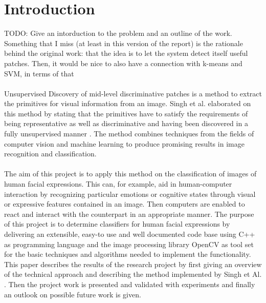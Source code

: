 
\section{Introduction}\label{sec:Introduction}

TODO: Give an intorduction to the problem and an outline of the work. Something that I miss (at least in this version of the report) is the rationale behind the original work: that the idea is to let the system detect itself useful patches. Then, it would be nice to also have a connection with k-means and SVM, in terms of that
\\
\\
Unsupervised Discovery of mid-level discriminative patches is a method to extract the primitives for visual information from an image.  Singh et al. elaborated on this method by stating that the primitives have to satisfy the requirements of being representative as well as discriminative and having been discovered in a fully unsupervised manner \cite{Singh2012DiscPat}. The method combines techniques from the fields of computer vision and machine learning to produce promising results in image recognition and classification. 
\\
\\
The aim of this project is to apply this method on the classification of images of human facial expressions. This can, for example, aid in human-computer interaction by recognizing particular emotions or cognitive states through visual or expressive features contained in an image. Then computers are enabled to react and interact with the counterpart in an appropriate manner. The purpose of this project is to determine classifiers for human facial expressions by delivering an extensible, easy-to use and well documented code base using C++ as programming language and the image processing library OpenCV as tool set for the basic techniques and algorithms needed to implement the functionality. This paper describes the results of the research project by first giving an overview of the technical approach and describing the method implemented by Singh et Al. \cite{Singh2012DiscPat}. Then the project work is presented and validated with experiments and finally an outlook on possible future work is given.